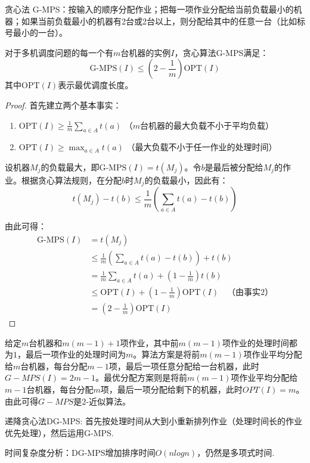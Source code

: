 \documentclass[./../main.tex]{subfiles} %
\begin{document}
贪心法 G-MPS：按输入的顺序分配作业；把每一项作业分配给当前负载最小的机器；如果当前负载最小的机器有2台或2台以上，则分配给其中的任意一台（比如标号最小的一台）。

\begin{theorem}
对于多机调度问题的每一个有$m$台机器的实例$I$，贪心算法G-MPS满足：
$$ \text{G-MPS}(I) \leq \left(2 - \frac{1}{m}\right) \text{OPT}(I) $$
其中$\text{OPT}(I)$表示最优调度长度。
\end{theorem}

\begin{proof}
首先建立两个基本事实：
\begin{enumerate}
    \item $\text{OPT}(I) \geq \frac{1}{m}\sum_{a\in A}t(a)$ \quad （$m$台机器的最大负载不小于平均负载）
    \item $\text{OPT}(I) \geq \max_{a\in A}t(a)$ \quad （最大负载不小于任一作业的处理时间）
\end{enumerate}

设机器$M_j$的负载最大，即$\text{G-MPS}(I) = t(M_j)$。令$b$是最后被分配给$M_j$的作业。根据贪心算法规则，在分配$b$时$M_j$的负载最小，因此有：
$$ t(M_j) - t(b) \leq \frac{1}{m}\left(\sum_{a\in A}t(a) - t(b)\right) $$

由此可得：
\begin{align*}
\text{G-MPS}(I) &= t(M_j) \\
&\leq \frac{1}{m}\left(\sum_{a\in A}t(a) - t(b)\right) + t(b) \\
&= \frac{1}{m}\sum_{a\in A}t(a) + \left(1-\frac{1}{m}\right)t(b) \\
&\leq \text{OPT}(I) + \left(1-\frac{1}{m}\right)\text{OPT}(I) \quad \text{（由事实2）} \\
&= \left(2 - \frac{1}{m}\right)\text{OPT}(I)
\end{align*}
\end{proof}

给定$m$台机器和$m(m-1)+1$项作业，其中前$m(m-1)$项作业的处理时间都为$1$，最后一项作业的处理时间为$m$。算法方案是将前$m(m-1)$项作业平均分配给$m$台机器，每台分配$m-1$项，最后一项任意分配给一台机器，此时$G-MPS(I)=2m-1$。最优分配方案则是将前$m(m-1)$项作业平均分配给$m-1$台机器，每台分配$m$项，最后一项分配给剩下的机器，此时$OPT(I)=m$。由此可得$G-MPS$是$2$-近似算法。

递降贪心法DG-MPS:
首先按处理时间从大到小重新排列作业（处理时间长的作业优先处理），然后运用G-MPS.

时间复杂度分析：DG-MPS增加排序时间$O(nlogn)$，仍然是多项式时间.
\end{document}
